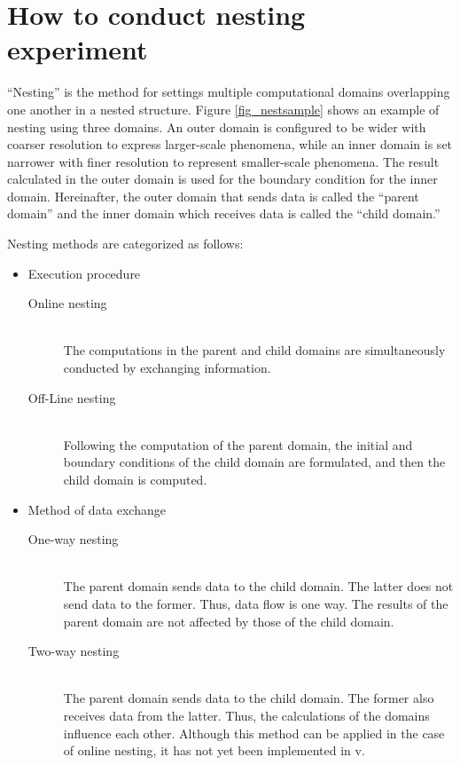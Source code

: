 \section{How to conduct nesting experiment} \label{sec:nest_exp}

``Nesting'' is the method for settings multiple computational domains overlapping one another in a nested structure. Figure \ref{fig_nestsample} shows an example of nesting using three domains. An outer domain is configured to be wider with coarser resolution to express larger-scale phenomena, while an inner domain is set narrower with finer resolution to represent smaller-scale phenomena. The result calculated in the outer domain is used for the boundary condition for the inner domain.
Hereinafter, the outer domain that sends data is called the ``parent domain'' and the inner domain which receives data is called the ``child domain.''

Nesting methods are categorized as follows:
\begin{itemize}
\item Execution procedure
\begin{description}
 \item[Online nesting]\mbox{}\\
The computations in the parent and child domains are simultaneously conducted by exchanging information.
 \item[Off-Line nesting]\mbox{}\\
Following the computation of the parent domain, the initial and boundary conditions of the child domain are formulated, and then the child domain is computed.
\end{description}
\item Method of data exchange
\begin{description}
 \item[One-way nesting]\mbox{}\\
The parent domain sends data to the child domain. The latter does not send data to the former. Thus, data flow is one way. The results of the parent domain are not affected by those of the child domain.
 \item[Two-way nesting]\mbox{}\\
The parent domain sends data to the child domain. The former also receives data from the latter. Thus, the calculations of the domains influence each other. Although this method can be applied in the case of online nesting, it has not yet been implemented in {\scalerm} v{\version}.
\end{description}
\end{itemize}

